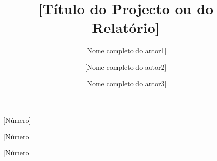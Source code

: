\title{[Título do Projecto ou do Relatório]}

\author[m]{[Nome completo do autor1]}{[Número]}
\author[m]{[Nome completo do autor2]}{[Número]}
\author[m]{[Nome completo do autor3]}{[Número]}



